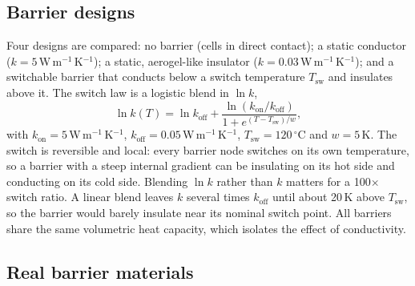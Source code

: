 \documentclass[11pt]{article}
\newcommand{\kon}{k_\mathrm{on}}
\newcommand{\koff}{k_\mathrm{off}}
\newcommand{\Tsw}{T_\mathrm{sw}}
\begin{document}
\subsection{Barrier designs}

Four designs are compared: no barrier (cells in direct contact); a static conductor
($k = 5$\,W\,m$^{-1}$\,K$^{-1}$); a static, aerogel-like insulator
($k = 0.03$\,W\,m$^{-1}$\,K$^{-1}$); and a switchable barrier that conducts below a
switch temperature $\Tsw$ and insulates above it. The switch law is a logistic blend in
$\ln k$,
\begin{equation}
  \ln k(T) = \ln \koff + \frac{\ln(\kon/\koff)}{1 + e^{(T-\Tsw)/w}},
  \label{eq:switch}
\end{equation}
with $\kon = 5$\,W\,m$^{-1}$\,K$^{-1}$, $\koff = 0.05$\,W\,m$^{-1}$\,K$^{-1}$,
$\Tsw = 120\,^\circ$C and $w = 5$\,K. The switch is reversible and local: every barrier
node switches on its own temperature, so a barrier with a steep internal gradient can be
insulating on its hot side and conducting on its cold side. Blending $\ln k$ rather than
$k$ matters for a 100$\times$ switch ratio. A linear blend leaves $k$ several times
$\koff$ until about 20\,K above $\Tsw$, so the barrier would barely insulate near its
nominal switch point. All barriers share the same volumetric heat capacity, which
isolates the effect of conductivity.

\subsection{Real barrier materials}
\label{sec:materials-model}
\end{document}
